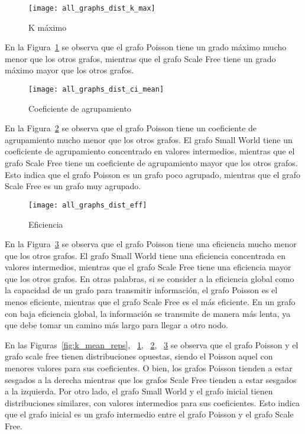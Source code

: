 \documentclass{article}
\begin{document}
\begin{figure}[h!]
      \centering
      \texttt{[image: all\_graphs\_dist\_k\_max]}
      \caption{K máximo}
      \label{fig:k_max_reps}
\end{figure}

En la Figura~\ref{fig:k_max_reps} se observa que el grafo Poisson tiene un grado máximo mucho menor que los otros grafos, mientras que el grafo Scale Free tiene un grado máximo mayor que los otros grafos.

\begin{figure}[h!]
      \centering
      \texttt{[image: all\_graphs\_dist\_ci\_mean]}
      \caption{Coeficiente de agrupamiento}
    \label{fig:ci_reps}
\end{figure}

En la Figura~\ref{fig:ci_reps} se observa que el grafo Poisson tiene un coeficiente de agrupamiento mucho menor que los otros grafos.
El grafo Small World tiene un coeficiente de agrupamiento concentrado en valores intermedios, mientras que el grafo Scale Free tiene un coeficiente de agrupamiento mayor que los otros grafos.
Esto indica que el grafo Poisson es un grafo poco agrupado, mientras que el grafo Scale Free es un grafo muy agrupado.

\begin{figure}[h!]
      \centering
      \texttt{[image: all\_graphs\_dist\_eff]}
      \caption{Eficiencia}
    \label{fig:eff_n_reps}
\end{figure}

En la Figura~\ref{fig:eff_n_reps} se observa que el grafo Poisson tiene una eficiencia mucho menor que los otros grafos.
El grafo Small World tiene una eficiencia concentrada en valores intermedios, mientras que el grafo Scale Free tiene una eficiencia mayor que los otros grafos.
En otras palabras, si se consider a la eficiencia global como la capacidad de un grafo para transmitir información, el grafo Poisson es el menos eficiente, mientras que el grafo Scale Free es el más eficiente.
En un grafo con baja eficiencia global, la información se transmite de manera más lenta, ya que debe tomar un camino más largo para llegar a otro nodo.

En las Figuras~\ref{fig:k_mean_reps}, ~\ref{fig:k_max_reps}, ~\ref{fig:ci_reps}, ~\ref{fig:eff_n_reps} se observa que el grafo Poisson y el grafo scale free tienen distribuciones opuestas, siendo el Poisson aquel con menores valores para sus coeficientes.
O bien, los grafos Poisson tienden a estar sesgados a la derecha mientras que los grafos Scale Free tienden a estar sesgados a la izquierda.
Por otro lado, el grafo Small World y el grafo inicial tienen distribuciones similares, con valores intermedios para sus coeficientes.
Esto indica que el grafo inicial es un grafo intermedio entre el grafo Poisson y el grafo Scale Free.

\medskip

{
\small


}



\end{document}
